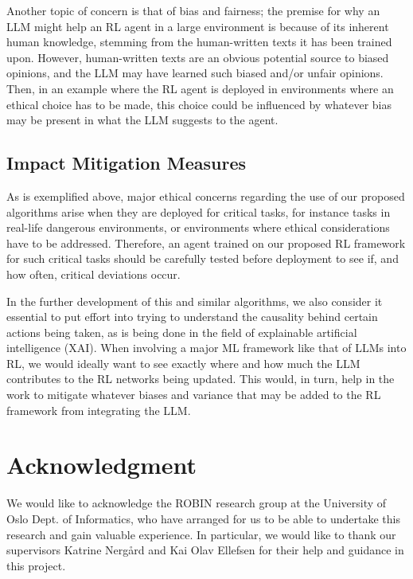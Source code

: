 \documentclass[conference]{IEEEtran}
\begin{document}
Another topic of concern is that of bias and fairness; the premise for why an LLM might help an RL agent in a large environment is because of its inherent human knowledge, stemming from the human-written texts it has been trained upon. However, human-written texts are an obvious potential source to biased opinions, and the LLM may have learned such biased and/or unfair opinions. Then, in an example where the RL agent is deployed in environments where an ethical choice has to be made, this choice could be influenced by whatever bias may be present in what the LLM suggests to the agent.

\subsection*{Impact Mitigation Measures}

As is exemplified above, major ethical concerns regarding the use of our proposed algorithms arise when they are deployed for critical tasks, for instance tasks in real-life dangerous environments, or environments where ethical considerations have to be addressed. Therefore, an agent trained on our proposed RL framework for such critical tasks should be carefully tested before deployment to see if, and how often, critical deviations occur.

In the further development of this and similar algorithms, we also consider it essential to put effort into trying to understand the causality behind certain actions being taken, as is being done in the field of explainable artificial intelligence (XAI). When involving a major ML framework like that of LLMs into RL, we would ideally want to see exactly where and how much the LLM contributes to the RL networks being updated. This would, in turn, help in the work to mitigate whatever biases and variance that may be added to the RL framework from integrating the LLM.

\section*{Acknowledgment}

We would like to acknowledge the ROBIN research group at the University of Oslo Dept. of Informatics, who have arranged for us to be able to undertake this research and gain valuable experience. In particular, we would like to thank our supervisors Katrine Nergård and Kai Olav Ellefsen for their help and guidance in this project.



\end{document}
